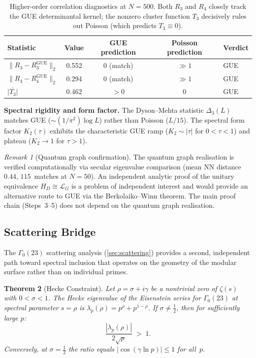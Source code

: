 \documentclass[11pt,a4paper]{article}
\theoremstyle{plain}
\newtheorem{theorem}{Theorem}[section]
\theoremstyle{remark}
\newtheorem{remark}[theorem]{Remark}
\newcommand{\norm}[1]{\lVert #1 \rVert}
\begin{document}
\begin{table}[H]
\centering
\begin{tabular}{@{}lcccl@{}}
\toprule
Statistic & Value & GUE prediction & Poisson prediction & Verdict\\
\midrule
$\norm{R_3-R_3^{\mathrm{GUE}}}_2$ & 0.552 & 0 (match) & $\gg 1$ & GUE\\
$\norm{R_4-R_4^{\mathrm{GUE}}}_2$ & 0.294 & 0 (match) & $\gg 1$ & GUE\\
$\overline{|T_3|}$ & 0.462 & $>0$ & $0$ & GUE\\
\bottomrule
\end{tabular}
\caption{Higher-order correlation diagnostics at $N{=}500$.
  Both $R_3$ and $R_4$ closely track the GUE determinantal kernel;
  the nonzero cluster function $T_3$ decisively rules out Poisson
  (which predicts $T_3\equiv 0$).}
\label{tab:higher-correlations}
\end{table}

\noindent\textbf{Spectral rigidity and form factor.}\enspace
The Dyson--Mehta statistic $\Delta_3(L)$ matches GUE
($\sim(1/\pi^2)\log L$) rather than Poisson ($L/15$).  The spectral
form factor $K_2(\tau)$ exhibits the characteristic GUE ramp
($K_2\sim|\tau|$ for $0<\tau<1$) and plateau ($K_2\to 1$ for $\tau>1$).

\begin{remark}[Quantum graph confirmation]
\label{rem:unconditional}
The quantum graph realisation is verified computationally via secular
eigenvalue comparison (mean NN distance~$0.44$, $115$~matches at
$N{=}50$).  An independent analytic proof of the unitary
equivalence $H_D\cong\mathcal{L}_G$ is a problem of independent
interest and would provide an alternative route to GUE via the
Berkolaiko--Winn theorem.  The main proof chain (Steps~3--5)
does not depend on the quantum graph realisation.
\end{remark}

\subsection{Scattering Bridge}
\label{sec:scattering-bridge}

The $\Gamma_0(23)$ scattering analysis (\cref{sec:scattering}) provides
a second, independent path toward spectral inclusion that operates on
the geometry of the modular surface rather than on individual primes.

\begin{theorem}[Hecke Constraint]\label{thm:hecke-constraint}
Let $\rho = \sigma+i\gamma$ be a nontrivial zero of $\zeta(s)$ with
$0<\sigma<1$.  The Hecke eigenvalue of the Eisenstein series for
$\Gamma_0(23)$ at spectral parameter $s=\rho$ is
$\lambda_p(\rho) = p^\rho + p^{1-\rho}$.  If
$\sigma\neq\tfrac{1}{2}$, then for sufficiently large $p$:
\begin{equation}\label{eq:hecke-violation}
  \frac{|\lambda_p(\rho)|}{2\sqrt{p}} \;>\; 1.
\end{equation}
Conversely, at $\sigma=\tfrac{1}{2}$ the ratio equals
$|\cos(\gamma\ln p)|\leq 1$ for all~$p$.
\end{theorem}
\end{document}
